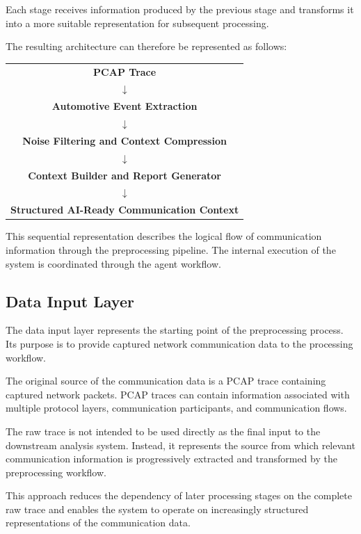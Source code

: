 Each stage receives information produced by the previous stage and transforms it into a more suitable representation for subsequent processing.

The resulting architecture can therefore be represented as follows:

\begin{center}
\begin{tabular}{c}
\textbf{PCAP Trace} \\[1ex]
$\downarrow$ \\[1ex]
\textbf{Automotive Event Extraction} \\[1ex]
$\downarrow$ \\[1ex]
\textbf{Noise Filtering and Context Compression} \\[1ex]
$\downarrow$ \\[1ex]
\textbf{Context Builder and Report Generator} \\[1ex]
$\downarrow$ \\[1ex]
\textbf{Structured AI-Ready Communication Context}
\end{tabular}
\end{center}

This sequential representation describes the logical flow of communication information through the preprocessing pipeline. The internal execution of the system is coordinated through the agent workflow.

\subsection{Data Input Layer}

The data input layer represents the starting point of the preprocessing process. Its purpose is to provide captured network communication data to the processing workflow.

The original source of the communication data is a PCAP trace containing captured network packets. PCAP traces can contain information associated with multiple protocol layers, communication participants, and communication flows.

The raw trace is not intended to be used directly as the final input to the downstream analysis system. Instead, it represents the source from which relevant communication information is progressively extracted and transformed by the preprocessing workflow.

This approach reduces the dependency of later processing stages on the complete raw trace and enables the system to operate on increasingly structured representations of the communication data.

